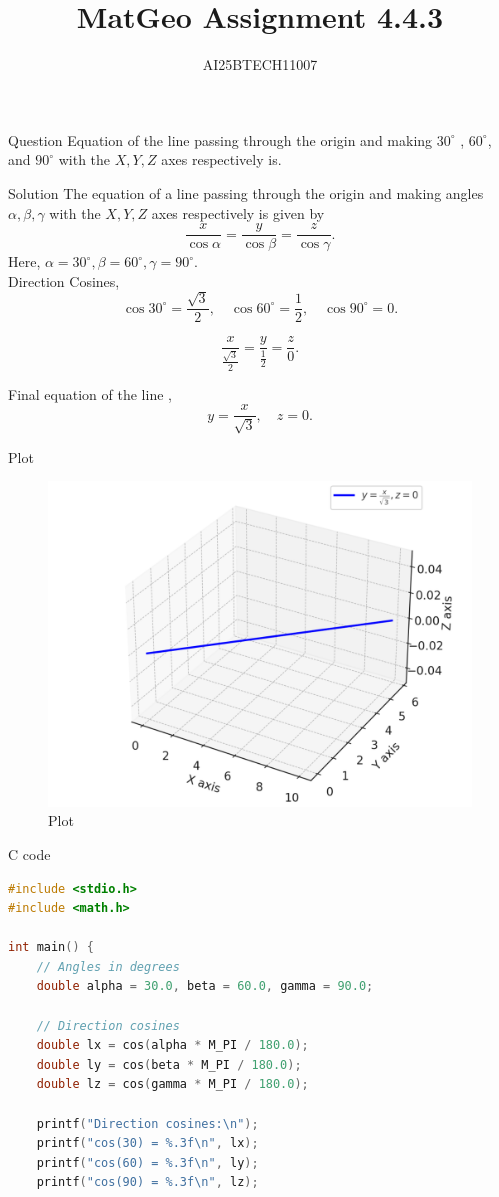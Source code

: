 \documentclass{beamer}
\title 
{MatGeo Assignment 4.4.3}
\author
{AI25BTECH11007}
\begin{document}
\frame{\titlepage}
\begin{frame}{Question}
Equation of the line passing through the origin and making $30^\circ$
, $60^\circ$, and $90^\circ$ with the $X, Y, Z$ axes respectively is.
\end{frame}

\begin{frame}{Solution}
    The equation of a line passing through the origin and making angles 
$\alpha, \beta, \gamma$ with the $X, Y, Z$ axes respectively is given by
\[
\frac{x}{\cos \alpha} = \frac{y}{\cos \beta} = \frac{z}{\cos \gamma}.
\]
Here, $\alpha = 30^\circ, \beta = 60^\circ, \gamma = 90^\circ$.\\

Direction Cosines,
\[
\cos 30^\circ = \frac{\sqrt{3}}{2}, \quad 
\cos 60^\circ = \frac{1}{2}, \quad 
\cos 90^\circ = 0.
\]

\[
\frac{x}{\frac{\sqrt{3}}{2}} = \frac{y}{\frac{1}{2}} = \frac{z}{0}.
\]


Final equation of the line ,
\[
y = \frac{x}{\sqrt{3}}, \quad z = 0.
\]
\end{frame}

\begin{frame}{Plot}
    \begin{figure}[H]
    \centering
    \includegraphics[width=0.85\linewidth]{figs/image.png}
    \caption{Plot}
    \label{fig:placeholder}
\end{figure}
\end{frame} 

\begin{frame}[fragile]{C code}
\begin{lstlisting}[language = c]
#include <stdio.h>
#include <math.h>

int main() {
    // Angles in degrees
    double alpha = 30.0, beta = 60.0, gamma = 90.0;

    // Direction cosines
    double lx = cos(alpha * M_PI / 180.0);
    double ly = cos(beta * M_PI / 180.0);
    double lz = cos(gamma * M_PI / 180.0);

    printf("Direction cosines:\n");
    printf("cos(30) = %.3f\n", lx);
    printf("cos(60) = %.3f\n", ly);
    printf("cos(90) = %.3f\n", lz);
\end{lstlisting}
\end{frame}
\end{document}
